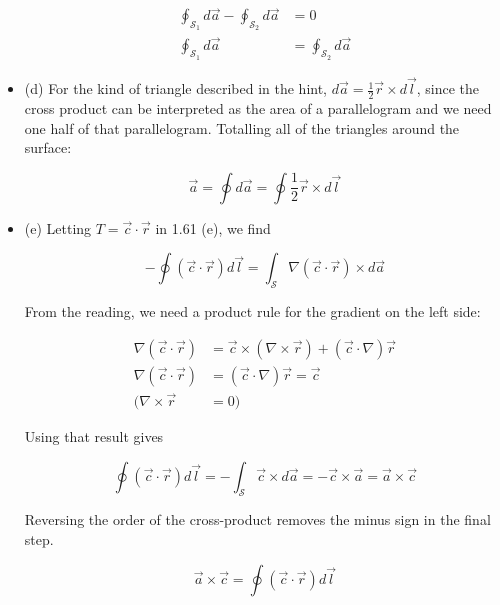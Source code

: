 \documentclass[10pt]{article}
\begin{document}
\begin{itemize}
\begin{align}
\oint_{\mathcal{S}_1} d\vec{a} - \oint_{\mathcal{S}_2} d\vec{a} &= 0 \\
\oint_{\mathcal{S}_1} d\vec{a} &= \oint_{\mathcal{S}_2} d\vec{a}
\end{align}

\item (d) For the kind of triangle described in the hint, $d\vec{a} = \frac{1}{2}\vec{r} \times d\vec{l}$, since the cross product can be interpreted as the area of a parallelogram and we need one half of that parallelogram.  Totalling all of the triangles around the surface:

\begin{equation}
\vec{a} = \oint d\vec{a} = \oint \frac{1}{2}\vec{r} \times d\vec{l}
\end{equation}

\item (e) Letting $T = \vec{c} \cdot \vec{r}$ in 1.61 (e), we find

\begin{equation}
- \oint (\vec{c} \cdot \vec{r}) d\vec{l} =  \int_{\mathcal{S}} \nabla (\vec{c} \cdot \vec{r}) \times d\vec{a}
\end{equation}

From the reading, we need a product rule for the gradient on the left side:

\begin{align}
\nabla (\vec{c} \cdot \vec{r}) &= \vec{c} \times (\nabla \times \vec{r}) + (\vec{c} \cdot \nabla)\vec{r} \\
\nabla (\vec{c} \cdot \vec{r}) &= (\vec{c} \cdot \nabla)\vec{r} = \vec{c} \\
(\nabla \times \vec{r} &= 0)
\end{align}

Using that result gives

\begin{equation}
\oint (\vec{c} \cdot \vec{r}) d\vec{l} =  -\int_{\mathcal{S}} \vec{c} \times d\vec{a} = - \vec{c} \times \vec{a} = \vec{a} \times \vec{c}
\end{equation}

Reversing the order of the cross-product removes the minus sign in the final step.

\begin{equation}
\vec{a} \times \vec{c} = \oint (\vec{c} \cdot \vec{r}) d\vec{l}
\end{equation}
\end{itemize}
\end{document}
